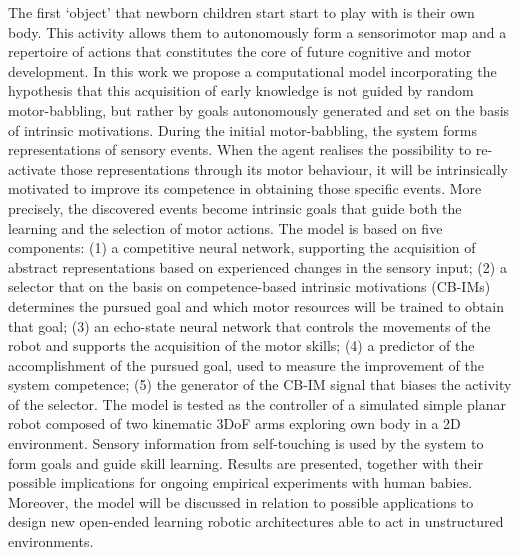 The first `object' that newborn children start start to play with is their own body. This activity allows them to autonomously form a sensorimotor map and a repertoire of actions that constitutes the core of future cognitive and motor development. In this work we propose a computational model incorporating the hypothesis that this acquisition of early knowledge is not guided by random motor-babbling, but rather by goals autonomously generated and set on the basis of intrinsic motivations. During the initial motor-babbling, the system forms representations of sensory events. When the agent realises the possibility to re-activate those representations through its motor behaviour, it will be intrinsically motivated to improve its competence in obtaining those specific events. More precisely, the discovered events become intrinsic goals that guide both the learning and the selection of motor actions. The model is based on five components: (1) a competitive neural network, supporting the acquisition of abstract representations based on experienced changes in the
sensory input; (2) a selector that on the basis on competence-based intrinsic motivations (CB-IMs) determines the pursued goal and which motor resources will be trained to obtain that goal; (3) an echo-state neural network that controls the movements of the robot and supports the acquisition of the motor skills; (4) a predictor of the accomplishment of the pursued goal, used to measure the improvement of the system competence; (5) the generator of the CB-IM signal that biases the activity of the selector. The model is tested as the controller of a simulated simple planar robot composed of two kinematic 3DoF arms exploring own body in a 2D environment. Sensory information from self-touching is used by the system to form goals and guide skill learning. Results are presented, together with their possible implications for ongoing empirical experiments with human babies. Moreover, the model will be discussed in relation to possible applications to design new open-ended learning robotic architectures able to act in unstructured environments.
 
